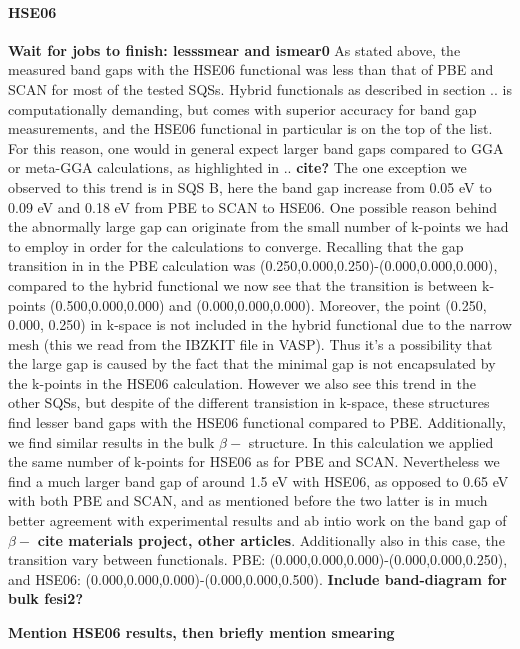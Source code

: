\paragraph{HSE06 \\}
\textbf{Wait for jobs to finish: lesssmear and ismear0}
As stated above, the measured band gaps with the HSE06 functional was less than that of PBE and SCAN for most of the tested SQSs. Hybrid functionals as described in section .. is computationally demanding, but comes with superior accuracy for band gap measurements, and the HSE06 functional in particular is on the top of the list. For this reason, one would in general expect larger band gaps compared to GGA or meta-GGA calculations, as highlighted in .. \textbf{cite?} The one exception we observed to this trend is in SQS B, here the band gap increase from 0.05 eV to 0.09 eV and 0.18 eV from PBE to SCAN to HSE06. One possible reason behind the abnormally large gap can originate from the small number of k-points we had to employ in order for the calculations to converge. Recalling that the gap transition in in the PBE calculation was (0.250,0.000,0.250)-(0.000,0.000,0.000), compared to the hybrid functional we now see that the transition is between k-points (0.500,0.000,0.000) and (0.000,0.000,0.000). Moreover, the point (0.250, 0.000, 0.250) in k-space is not included in the hybrid functional due to the narrow mesh (this we read from the IBZKIT file in VASP). Thus it's a possibility that the large gap is caused by the fact that the minimal gap is not encapsulated by the k-points in the HSE06 calculation. However we also see this trend in the other SQSs, but despite of the different transistion in k-space, these structures find lesser band gaps with the HSE06 functional compared to PBE. Additionally, we find similar results in the bulk $\beta-$ structure. In this calculation we applied the same number of k-points for HSE06 as for PBE and SCAN. Nevertheless we find a much larger band gap of around 1.5 eV with HSE06, as opposed to 0.65 eV with both PBE and SCAN, and as mentioned before the two latter is in much better agreement with experimental results and ab intio work on the band gap of $\beta-$ \textbf{cite materials project, other articles}. Additionally also in this case, the transition vary between functionals. PBE: (0.000,0.000,0.000)-(0.000,0.000,0.250), and HSE06: (0.000,0.000,0.000)-(0.000,0.000,0.500). \textbf{Include band-diagram for bulk fesi2?} 

\textbf{Mention HSE06 results, then briefly mention smearing}

